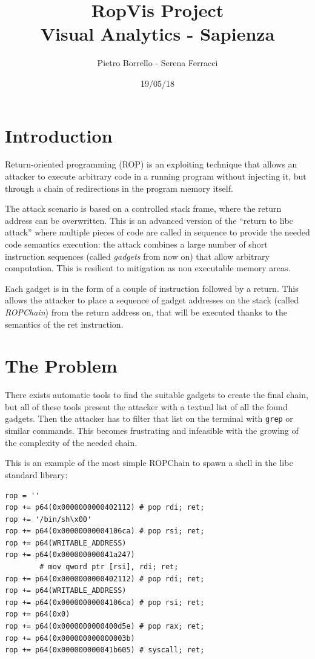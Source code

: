 \documentclass[11pt]{article}
\title{RopVis Project \\ \bigskip \large Visual Analytics -  Sapienza}
\author{Pietro Borrello - Serena Ferracci}
\date{19/05/18}
\begin{document}
\maketitle

\section{Introduction}
Return-oriented programming (ROP) is an exploiting technique that allows an attacker to execute arbitrary code in a running program without injecting it, but through a chain of redirections in the program memory itself. \cite{rop}

\bigskip
The attack scenario is based on a controlled stack frame, where the return address can be overwritten. This is an advanced version of the ``return to libc attack'' \cite{libc} where multiple pieces of code are called in sequence to provide the needed code semantics execution: the attack combines a large number of short instruction sequences (called \textit{gadgets} from now on) that allow arbitrary computation. This is resilient to mitigation as non executable memory areas.

Each gadget is in the form of a couple of instruction followed by a return. This allows the attacker to place a sequence of gadget addresses on the stack (called \textit{ROPChain}) from the return address on, that will be executed thanks to the semantics of the ret instruction.

\section{The Problem}
There exists automatic tools to find the suitable gadgets to create the final chain, but all of these tools present the attacker with a textual list of all the found gadgets. Then the attacker has to filter that list on the terminal with \texttt{grep} or similar commands. This becomes frustrating and infeasible with the growing of the complexity of the needed chain.

This is an example of the most simple ROPChain to spawn a shell in the libc standard library:

\begin{lstlisting}
rop = ''
rop += p64(0x0000000000402112) # pop rdi; ret;
rop += '/bin/sh\x00'
rop += p64(0x00000000004106ca) # pop rsi; ret;
rop += p64(WRITABLE_ADDRESS)
rop += p64(0x000000000041a247)
        # mov qword ptr [rsi], rdi; ret;
rop += p64(0x0000000000402112) # pop rdi; ret;
rop += p64(WRITABLE_ADDRESS)
rop += p64(0x00000000004106ca) # pop rsi; ret;
rop += p64(0x0)
rop += p64(0x0000000000400d5e) # pop rax; ret;
rop += p64(0x000000000000003b)
rop += p64(0x000000000041b605) # syscall; ret;
\end{lstlisting}
\end{document}
